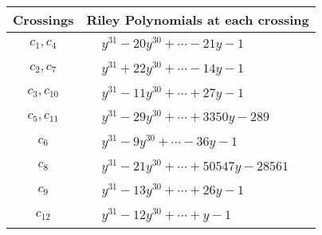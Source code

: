 \documentclass[1p]{elsarticle_modified}
\theoremstyle{definition}
\begin{document}
\begin{tabular}{m{50pt}|m{274pt}}
Crossings & \hspace{64pt}Riley Polynomials at each crossing \\
\hline $$\begin{aligned}c_{1},c_{4}\end{aligned}$$&$\begin{aligned}
&y^{31}-20 y^{30}+\cdots-21 y-1
\end{aligned}$\\
\hline $$\begin{aligned}c_{2},c_{7}\end{aligned}$$&$\begin{aligned}
&y^{31}+22 y^{30}+\cdots-14 y-1
\end{aligned}$\\
\hline $$\begin{aligned}c_{3},c_{10}\end{aligned}$$&$\begin{aligned}
&y^{31}-11 y^{30}+\cdots+27 y-1
\end{aligned}$\\
\hline $$\begin{aligned}c_{5},c_{11}\end{aligned}$$&$\begin{aligned}
&y^{31}-29 y^{30}+\cdots+3350 y-289
\end{aligned}$\\
\hline $$\begin{aligned}c_{6}\end{aligned}$$&$\begin{aligned}
&y^{31}-9 y^{30}+\cdots-36 y-1
\end{aligned}$\\
\hline $$\begin{aligned}c_{8}\end{aligned}$$&$\begin{aligned}
&y^{31}-21 y^{30}+\cdots+50547 y-28561
\end{aligned}$\\
\hline $$\begin{aligned}c_{9}\end{aligned}$$&$\begin{aligned}
&y^{31}-13 y^{30}+\cdots+26 y-1
\end{aligned}$\\
\hline $$\begin{aligned}c_{12}\end{aligned}$$&$\begin{aligned}
&y^{31}-12 y^{30}+\cdots+y-1
\end{aligned}$\\
\hline
\end{tabular}\\~\\
\end{document}
